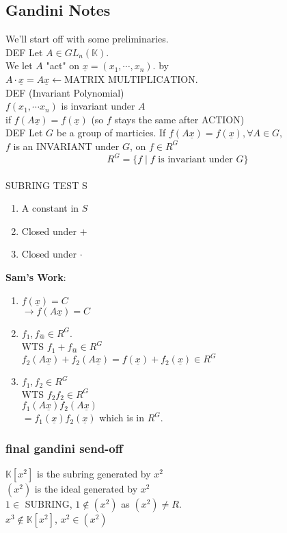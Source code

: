 \documentclass[10pt,oneside]{article}
\newcommand{\K}{\mathbb{K}}
\newcommand{\vpp}{\vspace{0.25cm}\\}
\begin{document}
\subsection*{Gandini Notes}{\newcommand{\ux}{\underline x}

We'll start off with some preliminaries. \vpp
DEF Let $A\in GL_n(\K).$\\
We let $A$ "act" on $\underline x=(x_1,\cdots, x_n)$.
by $A\cdot \ux=A\ux \leftarrow \text{MATRIX MULTIPLICATION}$. \vpp\color{red}
DEF (Invariant Polynomial)\\
$f(x_1,\cdots x_n)$ is invariant under $A$\\
if $f(A\ux)=f(\ux)$ (so $f$ stays the same after ACTION)\color{blue}\vpp
DEF Let $G$ be a group of marticies.
If $f(A\ux)=f(\ux), \forall A\in G,$\\
$f$ is an INVARIANT under $G$, on $f\in R^G$
$$R^G=\{f\mid f\text{ is invariant under } G\}$$\vpp\color{sasha}
SUBRING TEST S 
\begin{enumerate}
    \item A constant in $S$
    \item Closed under $+$
    \item Closed under $\cdot$
\end{enumerate}
\color{sam}
\textbf{Sam's Work}:
\begin{enumerate}
    \item $f(\ux)=C$\\
        $\rightarrow f(A\ux)=C$
    \item $f_1,f_@\in R^G$.\\
        WTS $f_1+f_@\in R^G$\\
        $f_2(A\ux)+f_2(A\ux)=f(\ux)+f_2(\ux)\in R^G$\\
    \item $f_1,f_2\in R^G$\\
        WTS $f_2f_2\in R^G$\\
        $f_1(A\ux)f_2(A\ux)$\\
        $=f_1(\ux)f_2(\ux)$ which is in $R^G$. 
\end{enumerate}\color{black}
\subsubsection*{final gandini send-off}
$\K[x^2]$ is the \color{red} subring generated by $x^2$\color{black}\\
$(x^2)$ is the \color{red} ideal generated by $x^2$\\
\color{sasha}$1\in $ SUBRING, \; $1\notin (x^2)$ as $(x^2)\neq R$. \\
\color{darkgreen}$x^3\notin \K[x^2]$, \; $x^2\in (x^2)$
}
\end{document}
